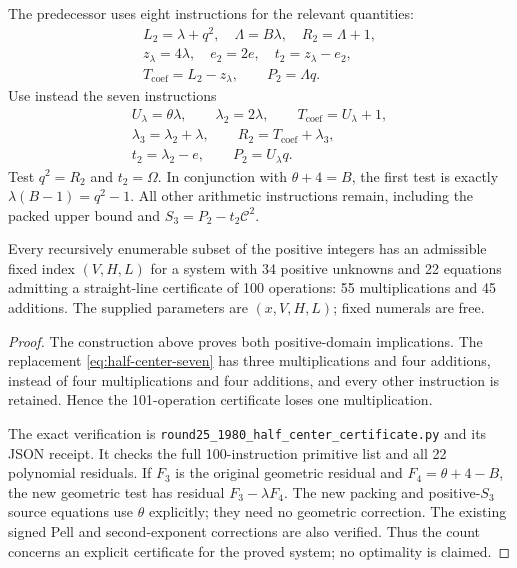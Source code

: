 The predecessor uses eight instructions for the relevant quantities:
\[
 \begin{gathered}
 L_2=\lambda+q^2,\quad \Lambda=B\lambda,\quad R_2=\Lambda+1,\\
 z_\lambda=4\lambda,\quad e_2=2e,\quad
 t_2=z_\lambda-e_2,\\
 T_{\mathrm{coef}}=L_2-z_\lambda,\qquad P_2=\Lambda q.
 \end{gathered}
\]
Use instead the seven instructions
\begin{equation}\label{eq:half-center-seven}
 \begin{gathered}
 U_\lambda=\theta\lambda,\qquad \lambda_2=2\lambda,\qquad
 T_{\mathrm{coef}}=U_\lambda+1,\\
 \lambda_3=\lambda_2+\lambda,\qquad
 R_2=T_{\mathrm{coef}}+\lambda_3,\\
 t_2=\lambda_2-e,\qquad P_2=U_\lambda q.
 \end{gathered}
\end{equation}
Test $q^2=R_2$ and $t_2=\Omega$. In conjunction with
$\theta+4=B$, the first test is exactly
$\lambda(B-1)=q^2-1$. All other arithmetic instructions remain,
including the packed upper bound and $S_3=P_2-t_2\mathcal C^2$.

\begin{theorem}\label{thm:best100-encoding}
Every recursively enumerable subset of the positive integers has an
admissible fixed index $(V,H,L)$ for a system with 34 positive unknowns
and 22 equations admitting a straight-line certificate of 100
operations: 55 multiplications and 45 additions. The supplied
parameters are $(x,V,H,L)$; fixed numerals are free.
\end{theorem}
\begin{proof}
The construction above proves both positive-domain implications.
The replacement \eqref{eq:half-center-seven} has three multiplications
and four additions, instead of four multiplications and four
additions, and every other instruction is retained. Hence the
101-operation certificate loses one multiplication.

The exact verification is
\texttt{round25\_1980\_half\_center\_certificate.py} and its JSON
receipt. It checks the full 100-instruction primitive list and all
22 polynomial residuals. If $F_3$ is the original geometric residual
and $F_4=\theta+4-B$, the new geometric test has residual
$F_3-\lambda F_4$. The new packing and positive-$S_3$ source equations
use $\theta$ explicitly; they need no geometric correction.
The existing signed Pell and second-exponent corrections are also
verified. Thus the count concerns an explicit certificate for the
proved system; no optimality is claimed.
\end{proof}
